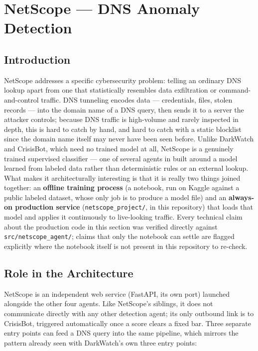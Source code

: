 \section{NetScope --- DNS Anomaly Detection}

\subsection*{Introduction}
NetScope addresses a specific cybersecurity problem: telling an ordinary DNS
lookup apart from one that statistically resembles data exfiltration or
command-and-control traffic. DNS tunneling encodes data --- credentials,
files, stolen records --- into the domain name of a DNS query, then sends
it to a server the attacker controls; because DNS traffic is high-volume
and rarely inspected in depth, this is hard to catch by hand, and hard to
catch with a static blocklist since the domain name itself may never have
been seen before. Unlike DarkWatch and CrisisBot, which need no trained
model at all, NetScope is a genuinely trained supervised classifier ---
one of several agents in \ProjectName{} built around a model learned from
labeled data rather than deterministic rules or an external lookup. What
makes it architecturally interesting is that it is really two things
joined together: an \textbf{offline training process} (a notebook, run on
Kaggle against a public labeled dataset, whose only job is to produce a
model file) and an \textbf{always-on production service}
(\texttt{netscope\_project/}, in this repository) that loads that model and
applies it continuously to live-looking traffic. Every technical claim
about the production code in this section was verified directly against
\texttt{src/netscope\_agent/}; claims that only the notebook can settle are
flagged explicitly where the notebook itself is not present in this
repository to re-check.

\subsection*{Role in the \ProjectName{} Architecture}
NetScope is an independent web service (FastAPI, its own port) launched
alongside the other four agents. Like NetScope's siblings, it does not
communicate directly with any other detection agent; its only outbound link
is to CrisisBot, triggered automatically once a score clears a fixed bar.
Three separate entry points can feed a DNS query into the same pipeline,
which mirrors the pattern already seen with DarkWatch's own three entry
points:

